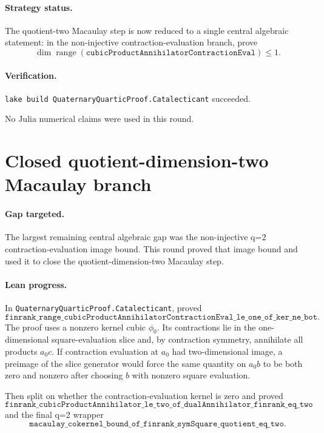 \documentclass[11pt]{article}
\begin{document}
\paragraph{Strategy status.}
The quotient-two Macaulay step is now reduced to a single central algebraic
statement: in the non-injective contraction-evaluation branch, prove
\[
\dim\operatorname{range}(\texttt{cubicProductAnnihilatorContractionEval})
\le 1.
\]

\paragraph{Verification.}
\texttt{lake build QuaternaryQuarticProof.Catalecticant} succeeded.

No Julia numerical claims were used in this round.

\section*{Closed quotient-dimension-two Macaulay branch}

\paragraph{Gap targeted.}
The largest remaining central algebraic gap was the non-injective q=2
contraction-evaluation image bound.  This round proved that image bound and
used it to close the quotient-dimension-two Macaulay step.

\paragraph{Lean progress.}
In \texttt{QuaternaryQuarticProof.Catalecticant}, proved
\[
\texttt{finrank\_range\_cubicProductAnnihilatorContractionEval\_le\_one\_of\_ker\_ne\_bot}.
\]
The proof uses a nonzero kernel cubic \(\phi_0\).  Its contractions lie in the
one-dimensional square-evaluation slice and, by contraction symmetry,
annihilate all products \(a_0c\).  If contraction evaluation at \(a_0\) had
two-dimensional image, a preimage of the slice generator would force the same
quantity on \(a_0b\) to be both zero and nonzero after choosing \(b\) with
nonzero square evaluation.

Then split on whether the contraction-evaluation kernel is zero and proved
\[
\texttt{finrank\_cubicProductAnnihilator\_le\_two\_of\_dualAnnihilator\_finrank\_eq\_two}
\]
and the final q=2 wrapper
\[
\texttt{macaulay\_cokernel\_bound\_of\_finrank\_symSquare\_quotient\_eq\_two}.
\]
\end{document}

